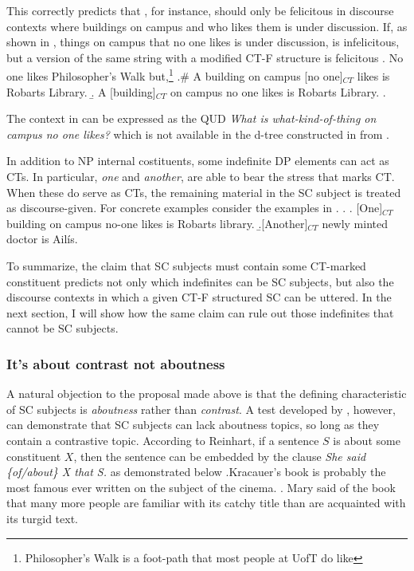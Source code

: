 \documentclass[GPFinal]{subfiles}
\begin{document}
This correctly predicts that \LLast[b], for instance, should only be felicitous in discourse contexts where buildings on campus and who likes them is under discussion.
If, as shown in \Next, things on campus that no one likes is under discussion, \LLast[b] is infelicitous, but a version of the same string with a modified CT-F structure is felicitous
\ex. No one likes Philosopher's Walk but,\footnote{Philosopher's Walk is a foot-path that most people at UofT do like}
\a.\# A building on campus [no one]$_{CT}$ likes is Robarts Library.
\b. A [building]$_{CT}$ on campus no one likes is Robarts Library.
\z.

The context in \Last can be expressed as the QUD \textit{What is what-kind-of-thing on campus no one likes?} which is not available in the d-tree constructed in \LLast from \Last[a].

In addition to NP internal costituents, some indefinite DP elements can act as CTs.
In particular, \textit{one} and \textit{another}, are able to bear the stress that marks CT.
When these do serve as CTs, the remaining material in the SC subject is treated as discourse-given.
For concrete examples consider the examples in \Next.
\ex.
\a.\label{ex:One} [One]$_{CT}$ building on campus no-one likes is Robarts library.
\b.\label{ex:Another}[Another]$_{CT}$ newly minted doctor is Ail\'is.

To summarize, the claim that SC subjects must contain some CT-marked constituent predicts not only which indefinites can be SC subjects, but also the discourse contexts in which a given CT-F structured SC can be uttered.
In the next section, I will show how the same claim can rule out those indefinites that cannot be SC subjects.
\subsubsection{It's about contrast not aboutness}
A natural objection to the proposal made above is that the defining characteristic of SC subjects is \textit{aboutness} rather than \textit{contrast}.
A test developed by \textcite{reinhart1981pragmatics}, however, can demonstrate that SC subjects can lack aboutness topics, so long as they contain a contrastive topic.
According to Reinhart, if a sentence $S$ is about some constituent $X$, then the sentence can be embedded by the clause \textit{She said \{of/about\} X that S.} as demonstrated below
\ex.Kracauer's book is probably the most famous ever written on the subject of the cinema.
\a. Mary said of the book that many more people are familiar with its catchy title than are acquainted with its turgid text.\hfill\parencite{reinhart1981pragmatics}
\end{document}
